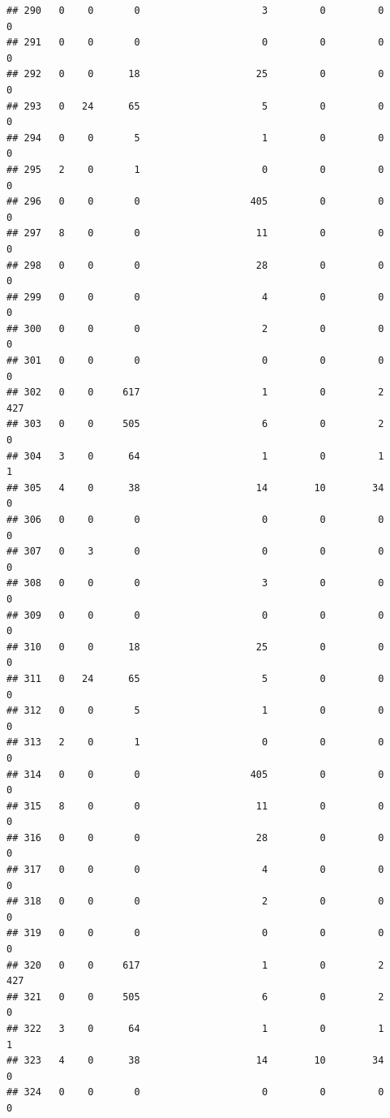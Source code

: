 \documentclass[
]{article}
\begin{document}
\begin{verbatim}
## 290   0    0       0                     3         0         0        0
## 291   0    0       0                     0         0         0        0
## 292   0    0      18                    25         0         0        0
## 293   0   24      65                     5         0         0        0
## 294   0    0       5                     1         0         0        0
## 295   2    0       1                     0         0         0        0
## 296   0    0       0                   405         0         0        0
## 297   8    0       0                    11         0         0        0
## 298   0    0       0                    28         0         0        0
## 299   0    0       0                     4         0         0        0
## 300   0    0       0                     2         0         0        0
## 301   0    0       0                     0         0         0        0
## 302   0    0     617                     1         0         2      427
## 303   0    0     505                     6         0         2        0
## 304   3    0      64                     1         0         1        1
## 305   4    0      38                    14        10        34        0
## 306   0    0       0                     0         0         0        0
## 307   0    3       0                     0         0         0        0
## 308   0    0       0                     3         0         0        0
## 309   0    0       0                     0         0         0        0
## 310   0    0      18                    25         0         0        0
## 311   0   24      65                     5         0         0        0
## 312   0    0       5                     1         0         0        0
## 313   2    0       1                     0         0         0        0
## 314   0    0       0                   405         0         0        0
## 315   8    0       0                    11         0         0        0
## 316   0    0       0                    28         0         0        0
## 317   0    0       0                     4         0         0        0
## 318   0    0       0                     2         0         0        0
## 319   0    0       0                     0         0         0        0
## 320   0    0     617                     1         0         2      427
## 321   0    0     505                     6         0         2        0
## 322   3    0      64                     1         0         1        1
## 323   4    0      38                    14        10        34        0
## 324   0    0       0                     0         0         0        0

\end{verbatim}
\end{document}
